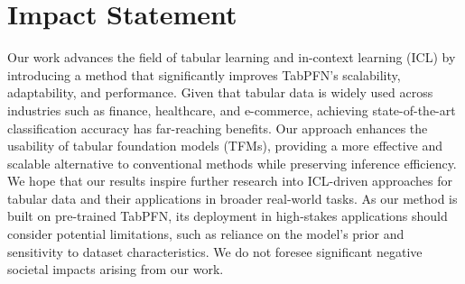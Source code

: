 \section*{Impact Statement}
Our work advances the field of tabular learning and in-context learning (ICL) by introducing a method that significantly improves TabPFN’s scalability, adaptability, and performance. Given that tabular data is widely used across industries such as finance, healthcare, and e-commerce, achieving state-of-the-art classification accuracy has far-reaching benefits. Our approach enhances the usability of tabular foundation models (TFMs), providing a more effective and scalable alternative to conventional methods while preserving inference efficiency.
We hope that our results inspire further research into ICL-driven approaches for tabular data and their applications in broader real-world tasks. As our method is built on pre-trained TabPFN, its deployment in high-stakes applications should consider potential limitations, such as reliance on the model's prior and sensitivity to dataset characteristics. We do not foresee significant negative societal impacts arising from our work.